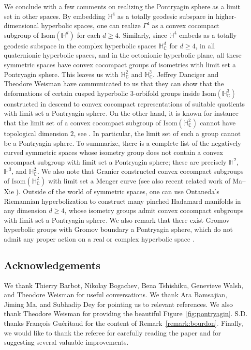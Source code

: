 \documentclass{amsart}
\theoremstyle{plain}
\theoremstyle{definition}
\theoremstyle{remark}
\numberwithin{equation}{section}
\newcommand{\cc}{\mathbb C}
\newcommand{\hh}{\mathbb H}
\renewcommand{\geq}{\geqslant}
\begin{document}
We conclude with a few comments on realizing the Pontryagin sphere as a limit set in other spaces.
By embedding $\hh^4$ as a totally geodesic subspace in higher-dimensional hyperbolic spaces, one can realize $\Gamma^4$ as a convex cocompact subgroup of  $\mathrm{Isom}(\hh^d)$ for each $d\geq 4$. 
Similarly, since  $\hh^4$ embeds as a totally geodesic subspace in the complex hyperbolic spaces $\hh^d_\mathbb{C}$ for $d\geq 4$, in all quaternionic hyperbolic spaces, and in the octonionic hyperbolic plane, all these symmetric spaces have convex cocompact groups of isometries with limit set a Pontryagin sphere.
This leaves us with $\hh_\cc^2$ and $\hh_\cc^3$.
Jeffrey Danciger and Theodore Weisman
have communicated to us that they can show that the deformations of certain cusped hyperbolic $3$-orbifold groups inside $\mathrm{Isom}(\hh_\cc^3)$ constructed in \cite{PT23} descend to convex cocompact representations of suitable quotients with limit set a Pontryagin sphere.
On the other hand, it is known for instance that the limit set of a convex cocompact subgroup of $\mathrm{Isom}(\hh_\cc^2)$ cannot have topological dimension $2$, see \cite[Theorem 17]{KAP22}. In particular, the limit set of such a group cannot be a Pontryagin sphere.
To summarize, there is a complete list of the negatively curved symmetric spaces whose isometry group does not contain a convex cocompact subgroup with limit set a Pontryagin sphere; these are precisely $\hh^2$, $\hh^3$, and $\hh_\cc^2$.
We also note that Granier \cite{Granier} constructed convex cocompact subgroups of $\mathrm{Isom}(\hh_\cc^2)$ with limit set a Menger curve (see also recent related work of Ma--Xie \cite{MaXie}).
Outside of the world of symmetric spaces, one can use Ontaneda's Riemannian hyperbolization  \cite{ON20} to construct many pinched Hadamard manifolds in any dimension $d\geq 4$, whose isometry groups admit convex cocompact subgroups with limit set a Pontryagin sphere.
We also remark that there exist Gromov hyperbolic groups with Gromov boundary a Pontryagin sphere, which do not admit any proper action on a real or complex hyperbolic space \cite{MR26}.


\subsection*{Acknowledgements} 
We thank Thierry Barbot, Nikolay Bogachev, Bena Tshishiku, Genevieve Walsh, and Theodore Weisman for useful conversations. We thank Ara Bamsajian, Jiming Ma, and Subhadip Dey for pointing us to relevant references. We also thank Theodore Weisman for providing the beautiful Figure~\ref{fig:pontryagin}.
S.D. thanks Fran\c{c}ois Gu\'eritaud for the content of Remark~\ref{remark:bourdon}. Finally, we would like to thank the referee for carefully reading the paper and for suggesting several valuable improvements.
\end{document}
